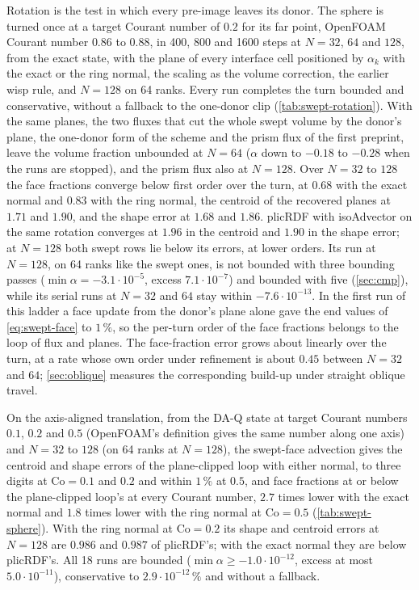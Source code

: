 \documentclass[preprint,12pt]{elsarticle}
\begin{document}
Rotation is the test in which every pre-image leaves its donor. The sphere is turned once at a target Courant number of $0.2$ for its far point, OpenFOAM Courant number $0.86$ to $0.88$, in 400, 800 and 1600 steps at $N = 32$, $64$ and $128$, from the exact state, with the plane of every interface cell positioned by $\alpha_k$ with the exact or the ring normal, the scaling as the volume correction, the earlier wisp rule, and $N = 128$ on 64 ranks. Every run completes the turn bounded and conservative, without a fallback to the one-donor clip (\cref{tab:swept-rotation}). With the same planes, the two fluxes that cut the whole swept volume by the donor's plane, the one-donor form of the scheme and the prism flux of the first preprint, leave the volume fraction unbounded at $N = 64$ ($\alpha$ down to $-0.18$ to $-0.28$ when the runs are stopped), and the prism flux also at $N = 128$. Over $N = 32$ to $128$ the face fractions converge below first order over the turn, at $0.68$ with the exact normal and $0.83$ with the ring normal, the centroid of the recovered planes at $1.71$ and $1.90$, and the shape error at $1.68$ and $1.86$. plicRDF with isoAdvector on the same rotation converges at $1.96$ in the centroid and $1.90$ in the shape error; at $N = 128$ both swept rows lie below its errors, at lower orders. Its run at $N = 128$, on 64 ranks like the swept ones, is not bounded with three bounding passes ($\min\alpha = -3.1\cdot10^{-5}$, excess $7.1\cdot10^{-7}$) and bounded with five (\cref{sec:cmp}), while its serial runs at $N = 32$ and $64$ stay within $-7.6\cdot10^{-13}$. In the first run of this ladder a face update from the donor's plane alone gave the end values of \cref{eq:swept-face} to $1\,\%$, so the per-turn order of the face fractions belongs to the loop of flux and planes. The face-fraction error grows about linearly over the turn, at a rate whose own order under refinement is about $0.45$ between $N = 32$ and $64$; \cref{sec:oblique} measures the corresponding build-up under straight oblique travel.

On the axis-aligned translation, from the DA-Q state at target Courant numbers $0.1$, $0.2$ and $0.5$ (OpenFOAM's definition gives the same number along one axis) and $N = 32$ to $128$ (on 64 ranks at $N = 128$), the swept-face advection gives the centroid and shape errors of the plane-clipped loop with either normal, to three digits at $\mathrm{Co} = 0.1$ and $0.2$ and within $1\,\%$ at $0.5$, and face fractions at or below the plane-clipped loop's at every Courant number, $2.7$ times lower with the exact normal and $1.8$ times lower with the ring normal at $\mathrm{Co} = 0.5$ (\cref{tab:swept-sphere}). With the ring normal at $\mathrm{Co} = 0.2$ its shape and centroid errors at $N = 128$ are $0.986$ and $0.987$ of plicRDF's; with the exact normal they are below plicRDF's. All 18 runs are bounded ($\min\alpha \ge -1.0\cdot10^{-12}$, excess at most $5.0\cdot10^{-11}$), conservative to $2.9\cdot10^{-12}\,\%$ and without a fallback.
\end{document}
